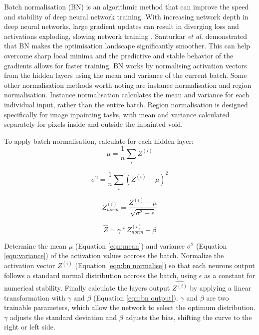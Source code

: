 \documentclass[twocolumn]{article}
\begin{document}
Batch normalisation (BN) is an algorithmic method that can improve the speed and stability of deep neural network training.
With increasing network depth in deep neural networks, large gradient updates can result in diverging loss and activations exploding, slowing network training\autocite{bjorckUnderstandingBatchNormalization2018} .
Santurkar \emph{et al.}\autocite{santurkarHowDoesBatch2018} demonstrated that BN makes the optimisation landscape significantly smoother.
This can help overcome sharp local minima and the predictive and stable behavior of the gradients allows for faster training.
BN works by normalising activation vectors from the hidden layers using the mean and variance of the current batch.
Some other normalisation methods worth noting are instance normalisation and region normalisation.
Instance normalisation calculates the mean and variance for each individual input, rather than the entire batch.\autocite{ulyanovInstanceNormalizationMissing2017}
Region normalisation is designed specifically for image inpainting tasks, with mean and variance calculated separately for pixels inside and outside the inpainted void.\autocite{yuRegionNormalizationImage2023}

To apply batch normalisation, calculate for each hidden layer:
\begin{equation}
\label{eqn:mean}
\mu = \frac{1}{n} \sum_{i}Z^{(i)}
\end{equation}

\begin{equation}
\label{eqn:variance}
\sigma^2 = \frac{1}{n} \sum_{i} (Z^{(i)} - \mu)^2
\end{equation}

\begin{equation}
\label{eqn:bn normalise}
Z^{(i)}_{norm} = \frac{Z^{(i)} - \mu}{\sqrt{\sigma^2 - \epsilon}}
\end{equation}

\begin{equation}
\label{eqn:bn output}
\hat{Z} = \gamma * Z^{(i)}_{norm} + \beta
\end{equation}

Determine the mean \(\mu\) (Equation \ref{eqn:mean}) and variance \(\sigma^2\) (Equation \ref{eqn:variance}) of the activation values accross the batch.
Normalize the activation vector \(Z^{(i)}\) (Equation \ref{eqn:bn normalise}) so that each neurons output follows a standard normal distribution accross the batch, using \(\epsilon\) as a constant for numerical stability.
Finally calculate the layers output \(\hat{Z^{(i)}}\) by applying a linear transformation with \(\gamma\) and \(\beta\) (Equation \ref{eqn:bn output}).
\(\gamma\) and \(\beta\) are two trainable parameters, which allow the network to select the optimum distribution.
\(\gamma\) adjusts the standard deviation and \(\beta\) adjusts the bias, shifting the curve to the right or left side.\autocite{huberBatchNormalizationLevels2022}
\end{document}
